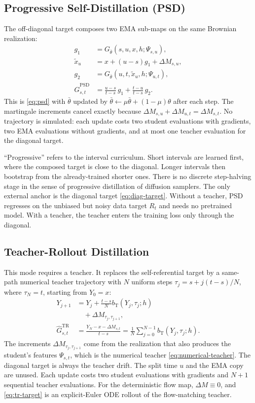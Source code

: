 \subsection{Progressive Self-Distillation (PSD)}
The off-diagonal target composes two EMA sub-maps on the same Brownian realization:
\begin{align}
 g_1&=G_{\bar\theta}(s,u,x,h;\Psi_{s,u}),\nonumber\\
 \widetilde x_u&=x+(u-s)g_1+\Delta M_{s,u},\nonumber\\
 g_2&=G_{\bar\theta}(u,t,\widetilde x_u,h;\Psi_{u,t}),\nonumber\\
 \widehat G^{\mathrm{PSD}}_{s,t}&=\tfrac{u-s}{t-s}\,g_1+\tfrac{t-u}{t-s}\,g_2.
 \label{eq:psd-target}
\end{align}
This is \eqref{eq:psd} with $\bar\theta$ updated by $\bar\theta\leftarrow\mu\bar\theta+(1-\mu)\theta$ after each step. The martingale increments cancel exactly because $\Delta M_{s,u}+\Delta M_{u,t}=\Delta M_{s,t}$. No trajectory is simulated: each update costs two student evaluations with gradients, two EMA evaluations without gradients, and at most one teacher evaluation for the diagonal target.

``Progressive'' refers to the interval curriculum. Short intervals are learned first, where the composed target is close to the diagonal. Longer intervals then bootstrap from the already-trained shorter ones. There is no discrete step-halving stage in the sense of progressive distillation of diffusion samplers. The only external anchor is the diagonal target \eqref{eq:diag-target}. Without a teacher, PSD regresses on the unbiased but noisy data target $R_t$ and needs no pretrained model. With a teacher, the teacher enters the training loss only through the diagonal.

\subsection{Teacher-Rollout Distillation}
This mode requires a teacher. It replaces the self-referential target by a same-path numerical teacher trajectory with $N$ uniform steps $\tau_j=s+j(t-s)/N$, where $\tau_N=t$, starting from $Y_0=x$:
\begin{align}
 Y_{j+1}&=Y_j+\tfrac{t-s}{N}b_{\mathrm T}(Y_j,\tau_j;h)\nonumber\\
 &\quad+\Delta M_{\tau_j,\tau_{j+1}},\nonumber\\
 \widehat G^{\mathrm{TR}}_{s,t}&=\frac{Y_N-x-\Delta M_{s,t}}{t-s}
 =\frac1N\sum_{j=0}^{N-1}b_{\mathrm T}(Y_j,\tau_j;h).
 \label{eq:tr-target}
\end{align}
The increments $\Delta M_{\tau_j,\tau_{j+1}}$ come from the realization that also produces the student's features $\Psi_{s,t}$, which is the numerical teacher \eqref{eq:numerical-teacher}. The diagonal target is always the teacher drift. The split time $u$ and the EMA copy are unused. Each update costs two student evaluations with gradients and $N+1$ sequential teacher evaluations. For the deterministic flow map, $\Delta M\equiv0$, and \eqref{eq:tr-target} is an explicit-Euler ODE rollout of the flow-matching teacher.

